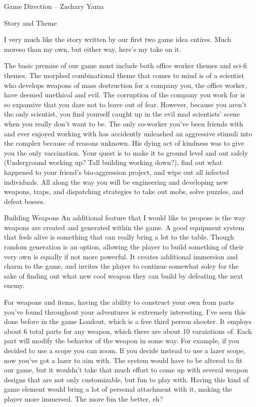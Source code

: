 \documentclass[12pt]{report}
\begin{document}
\begin{section}{Game Direction – Zachary Yama}
\begin{subsection}{Story and Theme}

I very much like the story written by our first two game idea entires. Much moreso than
my own, but either way, here's my take on it.

The basic premise of our game must include both office worker themes and sci-fi themes. 
The morphed combinational theme that comes to mind is of a scientist who develops weapons 
of mass destruction for a company you, the office worker, have deemed unethical and evil. 
The corruption of the company you work for is so expansive that you dare not to leave out 
of fear. However, because you aren’t the only scientist, you find yourself caught up in the 
evil mad scientists’ scene when you really don’t want to be. The only co-worker you’ve been 
friends with and ever enjoyed working with has accidently unleashed an aggressive stimuli 
into the complex because of reasons unknown. His dying act of kindness was to give you the 
only vaccination. Your quest is to make it to ground level and out safely (Underground 
working up? Tall building working down?), find out what happened to your friend’s 
bio-aggression project, and wipe out all infected individuals. All along the way you will 
be engineering and developing new weapons, traps, and dispatching strategies to take out 
mobs, solve puzzles, and defeat bosses.

\end{subsection}
\begin{subsection}{Building Weapons}
An additional feature that I would like to propose is the way weapons are created and
generated within the game. A good equipment system that feels alive is something that
can really bring a lot to the table. Though random generation is an option, allowing
the player to build something of their very own is equally if not more powerful. It 
creates additional immersion and charm to the game, and invites the player to continue
somewhat soley for the sake of finding out what new cool weapon they can build by 
defeating the next enemy.

For weapons and items, having the ability to construct your own from parts you've found 
throughout your adventures is extremely interesting. I've seen this done before in the
game Loadout, which is a free third person shooter. It employs about 6 total parts for
any weapon, which there are about 10 varaiations of. Each part will modify the behavior
of the weapon in some way. For example, if you decided to use a scope you can zoom. If
you decide instead to use a lazer scope, now you've got a lazer to aim with. The system
would have to be altered to fit our game, but it wouldn't take that much effort to come
up with several weapon designs that are not only customizable, but fun to play with. 
Having this kind of game element would bring a lot of personal attachment with it, making
the player more immersed. The more fun the better, eh?

\end{subsection}
\end{section}
\end{document}
